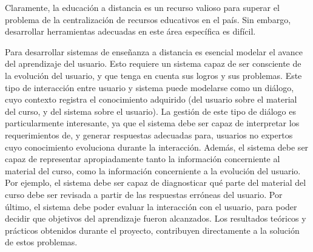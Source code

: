 \documentclass[11pt]{article}
\begin{document}
Claramente, la educaci\'on a distancia es un recurso valioso para superar el 
problema de la centralizaci\'on de recursos
educativos en el pa\'is. Sin embargo, desarrollar herramientas adecuadas en
este \'area espec\'ifica es dif\'icil.

Para desarrollar sistemas de ense\~nanza a distancia es esencial modelar el
avance del aprendizaje del usuario. Esto requiere un sistema capaz de ser
consciente de la evoluci\'on del usuario, y que tenga en cuenta sus logros y sus
problemas. Este tipo de interacci\'on entre usuario y sistema puede modelarse
como un di\'alogo, cuyo contexto registra el conocimiento adquirido (del usuario
sobre el material del curso, y del sistema sobre el usuario). La gesti\'on de
este tipo de di\'alogo es particularmente interesante, ya que el sistema debe
ser
capaz de interpretar los requerimientos de, y generar respuestas adecuadas para,
usuarios no expertos cuyo conocimiento evoluciona durante la interacci\'on.
Adem\'as, el sistema debe ser capaz de representar apropiadamente tanto la
informaci\'on concerniente al material del curso, como la informaci\'on
concerniente a la evoluci\'on del usuario. Por ejemplo, el sistema debe ser
capaz de diagnosticar qu\'e parte del material del curso debe ser revisada a
partir de las respuestas err\'oneas del usuario.  Por \'ultimo, el sistema debe
poder evaluar la interacci\'on con el usuario, para poder decidir
que objetivos del aprendizaje fueron alcanzados.
Los resultados te\'oricos y pr\'acticos obtenidos durante el proyecto,
contribuyen directamente a la soluci\'on de estos problemas.

% 
% 
\end{document}

